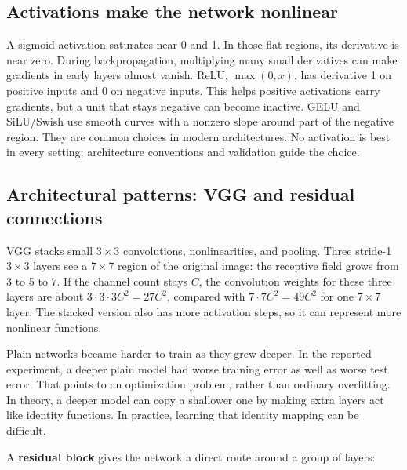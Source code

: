 \subsection{Activations make the network nonlinear}\label{04-visual-computing-ii-ch031-activations-make-the-network-nonlinear}

\hypertarget{04-visual-computing-ii-ch031-activations-make-the-network-nonlinear}{}

A sigmoid activation saturates near 0 and 1. In those flat regions, its derivative is near zero. During backpropagation, multiplying many small derivatives can make gradients in early layers almost vanish. ReLU, \(\max(0,x)\), has derivative 1 on positive inputs and 0 on negative inputs. This helps positive activations carry gradients, but a unit that stays negative can become inactive. GELU and SiLU/Swish use smooth curves with a nonzero slope around part of the negative region. They are common choices in modern architectures. No activation is best in every setting; architecture conventions and validation guide the choice.

\subsection{Architectural patterns: VGG and residual connections}\label{04-visual-computing-ii-ch031-architectural-patterns-vgg-and-residual-connections}

\hypertarget{04-visual-computing-ii-ch031-architectural-patterns-vgg-and-residual-connections}{}

VGG stacks small \(3\times3\) convolutions, nonlinearities, and pooling. Three stride-1 \(3\times3\) layers see a \(7\times7\) region of the original image: the receptive field grows from 3 to 5 to 7. If the channel count stays \(C\), the convolution weights for these three layers are about \(3\cdot3\cdot3C^2=27C^2\), compared with \(7\cdot7C^2=49C^2\) for one \(7\times7\) layer. The stacked version also has more activation steps, so it can represent more nonlinear functions.

Plain networks became harder to train as they grew deeper. In the reported experiment, a deeper plain model had worse training error as well as worse test error. That points to an optimization problem, rather than ordinary overfitting. In theory, a deeper model can copy a shallower one by making extra layers act like identity functions. In practice, learning that identity mapping can be difficult.

A \textbf{residual block} gives the network a direct route around a group of layers:

